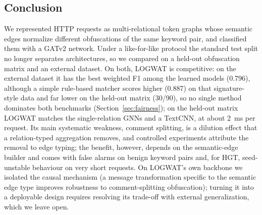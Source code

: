 \subsection{Conclusion}
We represented HTTP requests as multi-relational token graphs whose semantic edges normalize different obfuscations of the same keyword pair, and classified them with a GATv2 network. Under a like-for-like protocol the standard test split no longer separates architectures, so we compared on a held-out obfuscation matrix and an external dataset. On both, LOGWAT is competitive: on the external dataset it has the best weighted F1 among the learned models (0.796), although a simple rule-based matcher scores higher (0.887) on that signature-style data and far lower on the held-out matrix (30/90), so no single method dominates both benchmarks (Section~\ref{sec:fairness}); on the held-out matrix LOGWAT matches the single-relation GNNs and a TextCNN, at about 2~ms per request. Its main systematic weakness, comment splitting, is a dilution effect that a relation-typed aggregation removes, and controlled experiments attribute the removal to edge typing; the benefit, however, depends on the semantic-edge builder and comes with false alarms on benign keyword pairs and, for HGT, seed-unstable behaviour on very short requests. On LOGWAT's own backbone we isolated the causal mechanism (a message transformation specific to the semantic edge type improves robustness to comment-splitting obfuscation); turning it into a deployable design requires resolving its trade-off with external generalization, which we leave open.

